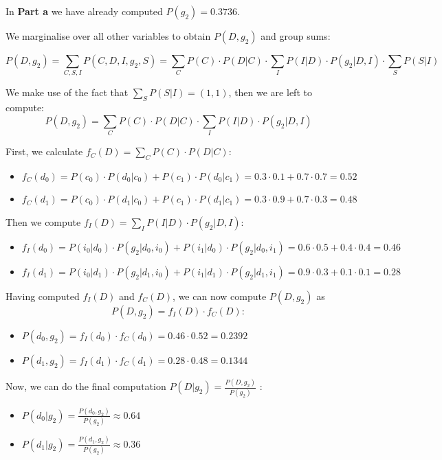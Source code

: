 \documentclass[11pt,a4paper]{article}
\begin{document}
	In \textbf{Part a} we have already computed $P(g_2) = 0.3736. $
	
	We marginalise over all other variables to obtain $P(D , g_2)$ and group sums:
	
	$$ P(D, g_2) = \sum_{C,S,I}P(C,D,I, g_2,S) = \sum_{C}P(C)\cdot P(D|C)\cdot \sum_{I}P(I|D) \cdot P(g_2|D,I) \cdot \sum_{S}P(S|I)$$
	
	We make use of the fact that $ \sum_{S}P(S|I) = (1, 1)$, then we are left to compute:
	$$ P(D,g_2)  = \sum_{C}P(C)\cdot P(D|C)\cdot \sum_{I}P(I|D) \cdot P(g_2|D,I)$$
	
	
	First, we calculate $ f_C(D) = \sum_{C}P(C) \cdot P(D|C): $
	\begin{itemize}
		\item $f_C(d_0) = P(c_0) \cdot P(d_0|c_0) + P(c_1) \cdot P(d_0|c_1) = 0.3 \cdot 0.1+0.7 \cdot 0.7 = 0.52$
		\item $f_C(d_1) = P(c_0) \cdot P(d_1|c_0) + P(c_1) \cdot P(d_1|c_1) = 0.3 \cdot 0.9 + 0.7 \cdot 0.3 = 0.48$
	\end{itemize}
	
	Then we compute $f_I(D) =  \sum_{I}P(I|D)\cdot P(g_2|D,I): $
	\begin{itemize}
		\item $f_I(d_0) = P(i_0|d_0) \cdot P(g_2|d_0,i_0) + P(i_1|d_0) \cdot P(g_2|d_0,i_1) = 0.6 \cdot 0.5 + 0.4 \cdot 0.4 = 0.46$
		\item $f_I(d_1) = P(i_0|d_1) \cdot P(g_2|d_1,i_0) + P(i_1|d_1) \cdot P(g_2|d_1,i_1)  = 0.9 \cdot 0.3 + 0.1 \cdot 0.1 = 0.28$
	\end{itemize} 
	
	Having computed $f_I(D)$ and $f_C(D)$, we can now compute $P(D,g_2)$ as $$P(D,g_2) = f_I(D) \cdot f_C(D): $$
	
	\begin{itemize}
		\item $P(d_0,g_2) = f_I(d_0) \cdot f_C(d_0) = 0.46  \cdot 0.52 = 0.2392 $
		\item $P(d_1,g_2) = f_I(d_1) \cdot f_C(d_1)  = 0.28  \cdot 0.48 = 0.1344 $
	\end{itemize}
	
	Now, we can do the final computation $ P(D | g_2) = \frac{P(D, g_2)}{P(g_2)} $ :
	\begin{itemize}
		\item $P(d_0|g_2) = \frac{P(d_0,g_2)}{P(g_2)} \approx 0.64 $
		\item $P(d_1|g_2) = \frac{P(d_1,g_2)}{P(g_2)} \approx 0.36 $
	\end{itemize}
	
\end{document}

